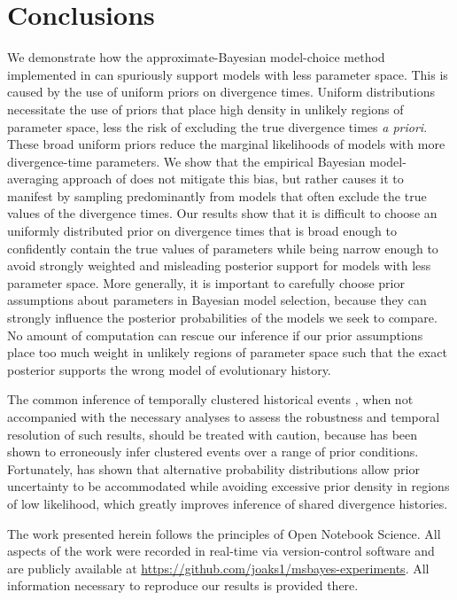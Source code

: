 \section{Conclusions}
We demonstrate how the approximate-Bayesian model-choice method implemented in
\msb can spuriously support models with less parameter space.
This is caused by the use of uniform priors on divergence times.
Uniform distributions necessitate the use of priors that place high density in
unlikely regions of parameter space, less the risk of excluding the true
divergence times \emph{a priori}.
These broad uniform priors reduce the marginal likelihoods of models with more
divergence-time parameters.
We show that the empirical Bayesian model-averaging approach of
\citet{Hickerson2013} does not mitigate this bias, but rather causes it to
manifest by sampling predominantly from models that often exclude the true
values of the divergence times.
Our results show that it is difficult to choose an uniformly distributed prior
on divergence times that is broad enough to confidently contain the true values
of parameters while being narrow enough to avoid strongly weighted and
misleading posterior support for models with less parameter space.
More generally, it is important to carefully choose prior assumptions about
parameters in Bayesian model selection, because they can strongly influence the
posterior probabilities of the models we seek to compare.
No amount of computation can rescue our inference if our prior assumptions
place too much weight in unlikely regions of parameter space such that the
exact posterior supports the wrong model of evolutionary history. 

The common inference of temporally clustered historical events
\citep{Barber2010, Bell2012, Carnaval2009, Chan2011, Chan2014, Daza2010,
    Hickerson2006, Huang2011, Lawson2010, Leache2007, Plouviez2009, Stone2012,
    Voje2009},
when not accompanied with the necessary analyses to assess the robustness and
temporal resolution of such results, should be treated with caution, because
\msb has been shown to erroneously infer clustered events over a range of prior
conditions.
Fortunately, \citet{Oaks2014dpp} has shown that alternative probability
distributions allow prior uncertainty to be accommodated while avoiding
excessive prior density in regions of low likelihood, which greatly improves
inference of shared divergence histories.

The work presented herein follows the principles of Open Notebook Science.
All aspects of the work were recorded in real-time via version-control software
and are publicly available at
\href{https://github.com/joaks1/msbayes-experiments}{\url{https://github.com/joaks1/msbayes-experiments}}.
All information necessary to reproduce our results is provided there.

